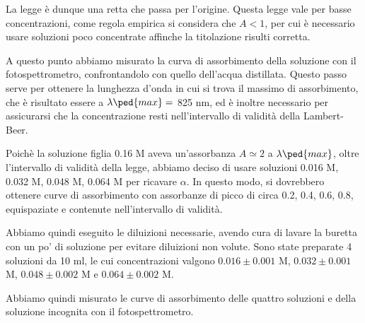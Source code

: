 La legge è dunque una retta che passa per l'origine. Questa legge vale per basse
concentrazioni, come regola empirica si considera che $A < 1$, per cui è necessario
usare soluzioni poco concentrate affinche la titolazione risulti corretta.

A questo punto abbiamo misurato la curva di assorbimento della soluzione con il
fotospettrometro, confrontandolo con quello dell'acqua distillata. Questo passo
serve per ottenere la lunghezza d'onda in cui si trova il massimo di assorbimento,
che è risultato essere a $\lambda\ped{max} =$ 825 nm, ed è inoltre necessario per
assicurarsi che la concentrazione resti nell'intervallo di validità della Lambert-Beer.

Poichè la soluzione figlia 0.16 M aveva un'assorbanza $A \simeq 2$ a $\lambda\ped{max}$,
oltre l'intervallo di validità della legge, abbiamo deciso di usare soluzioni
0.016 M, 0.032 M, 0.048 M, 0.064 M per ricavare $\alpha$. In questo modo, si dovrebbero
ottenere curve di assorbimento con assorbanze di picco di circa 0.2, 0.4, 0.6, 0.8,
equispaziate e contenute nell'intervallo di validità.

Abbiamo quindi eseguito le diluizioni necessarie, avendo cura di lavare la buretta con
un po' di soluzione per evitare diluizioni non volute. Sono state preparate 4 soluzioni
da 10 ml, le cui concentrazioni valgono $0.016 \pm 0.001$ M, $0.032 \pm 0.001$ M,
$0.048 \pm 0.002$ M e $0.064 \pm 0.002$ M.

Abbiamo quindi misurato le curve di assorbimento delle quattro soluzioni e della
soluzione incognita con il fotospettrometro.

